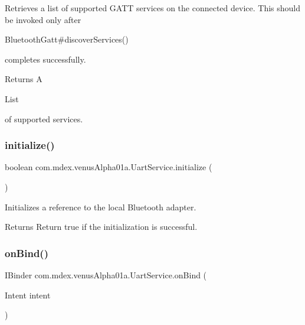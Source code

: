 Retrieves a list of supported G\+A\+TT services on the connected device. This should be invoked only after
\begin{DoxyCode}
BluetoothGatt#discoverServices() 
\end{DoxyCode}
 completes successfully.

\begin{DoxyReturn}{Returns}
A
\begin{DoxyCode}
List 
\end{DoxyCode}
 of supported services. 
\end{DoxyReturn}
\mbox{\label{classcom_1_1mdex_1_1venus_alpha01a_1_1_uart_service_ae30e283bbee81ca4f91aaa430b624c16}} 
\subsubsection{\texorpdfstring{initialize()}{initialize()}}
{\footnotesize\ttfamily boolean com.\+mdex.\+venus\+Alpha01a.\+Uart\+Service.\+initialize (\begin{DoxyParamCaption}{ }\end{DoxyParamCaption})}

Initializes a reference to the local Bluetooth adapter.

\begin{DoxyReturn}{Returns}
Return true if the initialization is successful. 
\end{DoxyReturn}
\mbox{\label{classcom_1_1mdex_1_1venus_alpha01a_1_1_uart_service_af26c2be1d82ba32fcb1f754cd0c9d0c5}} 
\subsubsection{\texorpdfstring{on\+Bind()}{onBind()}}
{\footnotesize\ttfamily I\+Binder com.\+mdex.\+venus\+Alpha01a.\+Uart\+Service.\+on\+Bind (\begin{DoxyParamCaption}\item[{Intent}]{intent }\end{DoxyParamCaption})}

